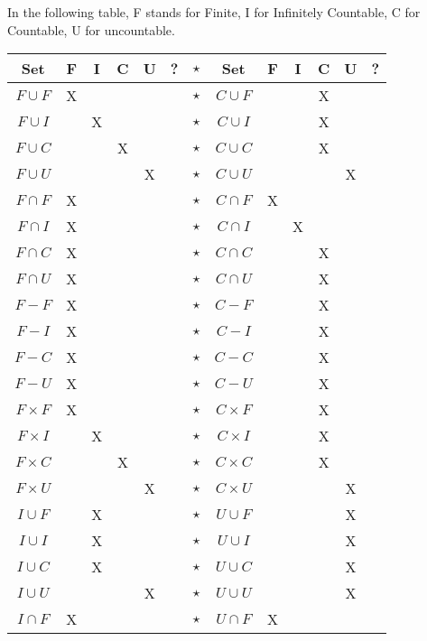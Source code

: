 \documentclass[11pt]{article}
\begin{document}
	In the following table, F stands for Finite, I for Infinitely Countable, C for Countable, U for uncountable.
 \begin{center}
	\begin{tabular}{c|c|c|c|c|c|c|c|c|c|c|c|c} \hline
  Set & F & I & C & U & ? & $\star$ & Set & F & I & C & U & ?  \\ \hline

$F \cup F$ & X & & & & & $\star$ & $C \cup F$ & & & X & & \\ \hline
$F \cup I$ & & X & & & & $\star$ & $C \cup I$ & & & X & & \\ \hline
$F \cup C$ & & & X & & & $\star$ & $C \cup C$ & & & X & & \\ \hline
$F \cup U$ & & & & X & & $\star$ & $C \cup U$ & & & & X & \\ \hline
$F \cap F$ & X & & & & & $\star$ & $C \cap F$ & X & & & & \\ \hline
$F \cap I$ & X & & & & & $\star$ & $C \cap I$ & & X & & & \\ \hline
$F \cap C$ & X & & & & & $\star$ & $C \cap C$ & & & X & & \\ \hline
$F \cap U$ & X & & & & & $\star$ & $C \cap U$ & & & X & & \\ \hline
$F - F$ & X & & & & & $\star$ & $C - F$ & & & X & & \\ \hline
$F - I$ & X &  & & & & $\star$ & $C - I$ & & & X & & \\ \hline
$F - C$ & X & & & & & $\star$ & $C - C$ & & & X & & \\ \hline
$F - U$ & X & & & & & $\star$ & $C - U$ & & & X & & \\ \hline
$F \times F$ & X & & & & & $\star$ & $C \times F$ & & & X & & \\ \hline
$F \times I$ & & X & & & & $\star$ & $C \times I$ & & & X & & \\ \hline
$F \times C$ & & & X & & & $\star$ & $C \times C$ & & & X & & \\ \hline
$F \times U$ & & & & X & & $\star$ & $C \times U$ & & & & X & \\ \hline
$I \cup F$ & & X & & & & $\star$ & $U \cup F$ & & & & X & \\ \hline
$I \cup I$ & & X & & & & $\star$ & $U \cup I$ & & & & X & \\ \hline
$I \cup C$ & & X & & & & $\star$ & $U \cup C$ & & & & X & \\ \hline
$I \cup U$ & & & & X & & $\star$ & $U \cup U$ & & & & X & \\ \hline
$I \cap F$ & X & & & & & $\star$ & $U \cap F$ & X & & & & \\ \hline

\end{tabular}
\end{center}
\end{document}

